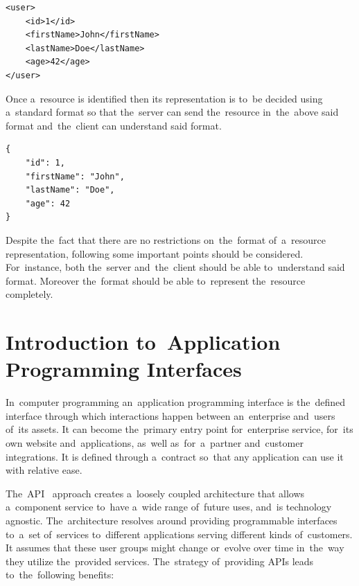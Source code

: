 \vspace{1mm}
\begin{lstlisting}[caption=An~example of~a~XML representation
of~a~\textit{user} resource., label=lst-XMLExample, style=dp-xml]
<user>
	<id>1</id>
	<firstName>John</firstName>
	<lastName>Doe</lastName>
	<age>42</age>
</user>
\end{lstlisting}

Once a~resource is identified then its representation is to~be decided using
a~standard format so that the~server can send the~resource in~the~above said
format and~the~client can understand said format.

\vspace{1mm}
\begin{lstlisting}[caption=An~example of~a~JSON representation
of~a~\textit{user} resource., label=lst-JSONExample, style=dp-default]
{
	"id": 1,
	"firstName": "John",
	"lastName": "Doe",
	"age": 42
}
\end{lstlisting}

Despite the~fact that there are no restrictions on~the~format of~a~resource
representation, following some important points should be considered.
For~instance, both the~server and~the~client should be able to~understand said
format. Moreover the~format should be able to~represent the~resource completely.


\section{Introduction to~Application Programming Interfaces}
In~computer programming an~application programming interface is the~defined
interface through which interactions happen between an~enterprise and~users
of~its assets. It can become the~primary entry point for~enterprise service,
for~its own website and~applications, as~well as~for~a~partner and~customer
integrations. It is defined through a~contract so~that any application can use
it with relative ease. 

The~API~\cite{RESTfulAPI} approach creates a~loosely coupled architecture that
allows a~component service to~have a~wide range of~future uses, and~is
technology agnostic. The~architecture resolves around providing programmable
interfaces to~a~set of~services to~different applications serving different
kinds of~customers. It assumes that these user groups might change or~evolve
over time in~the~way they utilize the~provided services. The~strategy
of~providing APIs leads to~the~following benefits:

